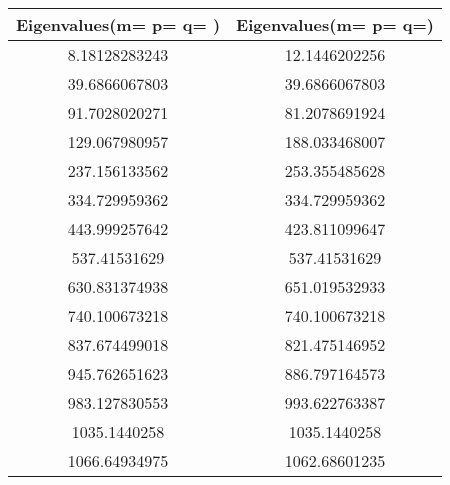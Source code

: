 \begin{tabular}{c |c} 
Eigenvalues(m= p= q= ) & Eigenvalues(m= p= q=) \\ 
\hline\hline
8.18128283243 & 12.1446202256\\ 
\hline
39.6866067803 & 39.6866067803\\ 
\hline
91.7028020271 & 81.2078691924\\ 
\hline
129.067980957 & 188.033468007\\ 
\hline
237.156133562 & 253.355485628\\ 
\hline
334.729959362 & 334.729959362\\ 
\hline
443.999257642 & 423.811099647\\ 
\hline
537.41531629 & 537.41531629\\ 
\hline
630.831374938 & 651.019532933\\ 
\hline
740.100673218 & 740.100673218\\ 
\hline
837.674499018 & 821.475146952\\ 
\hline
945.762651623 & 886.797164573\\ 
\hline
983.127830553 & 993.622763387\\ 
\hline
1035.1440258 & 1035.1440258\\ 
\hline
1066.64934975 & 1062.68601235\\ 
\hline
\end{tabular}